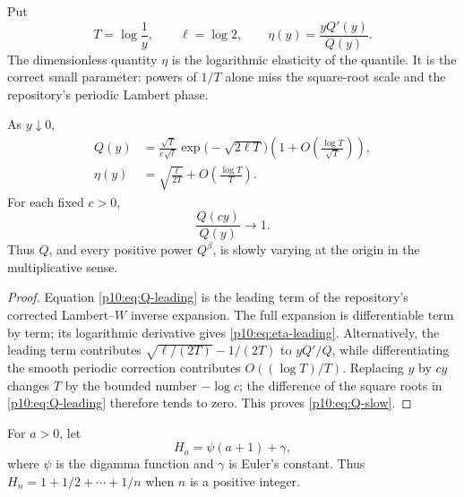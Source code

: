 \documentclass[11pt,oneside]{article}
\theoremstyle{definition}
\theoremstyle{remark}
\newcommand{\Q}{Q}
\newcommand{\1}{\mathbf 1}
\begin{document}
Put
\begin{equation}\label{p10:eq:T-eta-def}
 T=\log\frac1y,
 \qquad \ell=\log2,
 \qquad
 \eta(y)=\frac{y\Q'(y)}{\Q(y)}.
\end{equation}
The dimensionless quantity \(\eta\) is the logarithmic elasticity of the quantile.  It
is the correct small parameter: powers of \(1/T\) alone miss the square-root scale and
the repository's periodic Lambert phase.

\begin{proposition}\label{p10:prop:Q-slow-variation}
As \(y\downarrow0\),
\begin{align}
 \Q(y)
 &=\frac{\sqrt T}{e\sqrt\ell}
   \exp\!\bigl(-\sqrt{2\ell T}\bigr)
   \left(1+O\!\left(\frac{\log T}{\sqrt T}\right)\right),
 \label{p10:eq:Q-leading}\\
 \eta(y)
 &=\sqrt{\frac{\ell}{2T}}
   +O\!\left(\frac{\log T}{T}\right).
 \label{p10:eq:eta-leading}
\end{align}
For each fixed \(c>0\),
\begin{equation}\label{p10:eq:Q-slow}
 \frac{\Q(cy)}{\Q(y)}\longrightarrow1.
\end{equation}
Thus \(\Q\), and every positive power \(\Q^\beta\), is slowly varying at the
origin in the multiplicative sense.
\end{proposition}

\begin{proof}
Equation \eqref{p10:eq:Q-leading} is the leading term of the repository's corrected
Lambert--\(W\) inverse expansion.  The full expansion is differentiable term by term;
its logarithmic derivative gives \eqref{p10:eq:eta-leading}.  Alternatively, the leading
term contributes
\(
 \sqrt{\ell/(2T)}-1/(2T)
\)
to \(y\Q'/\Q\), while differentiating the smooth periodic correction contributes
\(O((\log T)/T)\).  Replacing \(y\) by \(cy\) changes \(T\) by the bounded number
\(-\log c\); the difference of the square roots in \eqref{p10:eq:Q-leading} therefore tends
to zero.  This proves \eqref{p10:eq:Q-slow}.
\end{proof}

For \(a>0\), let
\begin{equation}\label{p10:eq:continuous-harmonic}
 H_a=\psi(a+1)+\gamma,
\end{equation}
where \(\psi\) is the digamma function and \(\gamma\) is Euler's constant.  Thus
\(H_n=1+1/2+\cdots+1/n\) when \(n\) is a positive integer.
\end{document}
